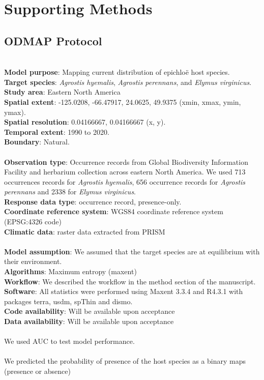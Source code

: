 \documentclass[11pt]{article}
\begin{document}
	\section*{Supporting Methods}
	\subsection*{ODMAP Protocol}\label{sec:sdm}
{\color{blue}{Overview}}\\
\textbf {Model  purpose}: Mapping current distribution of epichloë host species. \\
\textbf {Target species}: \emph{Agrostis hyemalis}, \emph{Agrostis perennans}, and \emph{Elymus virginicus}. \\
\textbf {Study area}: Eastern North America \\
\textbf {Spatial extent}: -125.0208, -66.47917, 24.0625, 49.9375 (xmin, xmax, ymin, ymax).\\
\textbf {Spatial resolution}: 0.04166667, 0.04166667 (x, y).\\
\textbf {Temporal extent}: 1990 to 2020.\\
\textbf {Boundary}: Natural.\\
{\color{blue}{Data}}\\
\textbf {Observation type}: Occurrence records from  Global Biodiversity Information Facility and herbarium collection across eastern North America. We used 713 occurrences records for \emph{Agrostis hyemalis}, 656 occurrence records for \emph{Agrostis perennans} and 2338 for \emph{Elymus virginicus}.\\
\textbf{Response data type}: occurrence record, presence-only.\\
\textbf{Coordinate reference system}: WGS84 coordinate reference system (EPSG:4326 code)\\
\textbf{Climatic data}:  raster data extracted from PRISM  \\
{\color{blue}{Model }}\\
\textbf{Model assumption}: We assumed that the target species are at equilibrium with their environment. \\
\textbf{Algorithms}: Maximum entropy (maxent)\\
\textbf{Workflow}: We  described the workflow in the method section of the manuscript. \\
\textbf{Software}:  All statistics were performed using Maxent 3.3.4 and R4.3.1 with packages terra, usdm, spThin and dismo.\\
\textbf{Code availability}: Will be available upon acceptance \\
\textbf{Data availability}: Will be available upon acceptance \\
{\color{blue}{Assessment}}\\
We used AUC to test model performance.\\
{\color{blue}{Prediction }}\\
We predicted the probability of presence of the host species as a binary maps (presence or absence)
\end{document}
